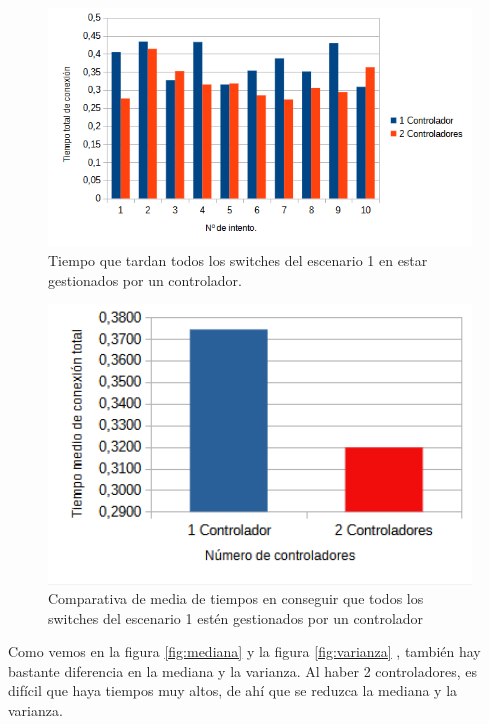 \documentclass[a4paper, 12pt]{book}
\begin{document}
 	\begin{figure}[H]
 		\centering
 		\includegraphics[width=16cm, keepaspectratio]{img/comparativabucle4}
 		\caption{Tiempo que tardan todos los switches del escenario 1 en estar gestionados por un controlador.}
 		\label{figura:comparativabucle4}
 	\end{figure}
 	
 	\begin{figure}[H]
 		\centering
 		\includegraphics[width=12cm, keepaspectratio]{img/comparativamediasbucle}
 		\caption{Comparativa de media de tiempos en conseguir que todos los switches del escenario 1 estén gestionados por un controlador}
 		\label{figura:mediabucle4}
 	\end{figure}
 	
 	Como vemos en la figura \ref{fig:mediana} y la figura \ref{fig:varianza} , también hay bastante diferencia en la mediana y la varianza. Al haber 2 controladores, es difícil que haya tiempos muy altos, de ahí que se reduzca la mediana y la varianza.
\end{document}
